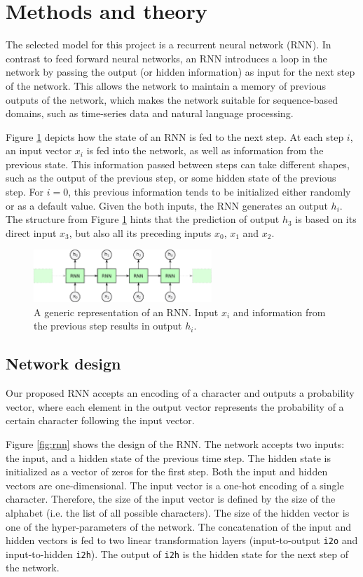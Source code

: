 \section{Methods and theory}
The selected model for this project is a recurrent neural network (RNN).
In contrast to feed forward neural networks, an RNN introduces a loop in the network by passing the output (or hidden information) as input for the next step of the network.
This allows the network to maintain a memory of previous outputs of the network, which makes the network suitable for sequence-based domains, such as time-series data and natural language processing.

Figure \ref{fig:unrolled} depicts how the state of an RNN is fed to the next step.
At each step $i$, an input vector $x_i$ is fed into the network, as well as information from the previous state.
This information passed between steps can take different shapes, such as the output of the previous step, or some hidden state of the previous step.
For $i=0$, this previous information tends to be initialized either randomly or as a default value.
Given the both inputs, the RNN generates an output $h_i$.
The structure from Figure \ref{fig:unrolled} hints that the prediction of output $h_3$ is based on its direct input $x_3$, but also all its preceding inputs $x_0$, $x_1$ and $x_2$.

\begin{figure}[t]
	\centering
	\includegraphics[width=0.6\textwidth]{figures/unrolled.eps} 
	\caption{A generic representation of an RNN. Input $x_i$ and information from the previous step results in output $h_i$.}
	\label{fig:unrolled}
\end{figure}

\subsection{Network design}
Our proposed RNN accepts an encoding of a character and outputs a probability vector, where each element in the output vector represents the probability of a certain character following the input vector.

Figure \ref{fig:rnn} shows the design of the RNN. The network accepts two inputs: the input, and a hidden state of the previous time step. 
The hidden state is initialized as a vector of zeros for the first step.
Both the input and hidden vectors are one-dimensional. 
The input vector is a one-hot encoding of a single character. 
Therefore, the size of the input vector is defined by the size of the alphabet (i.e. the list of all possible characters).
The size of the hidden vector is one of the hyper-parameters of the network.
The concatenation of the input and hidden vectors is fed to two linear transformation layers (input-to-output {\tt i2o} and input-to-hidden {\tt i2h}). 
The output of {\tt i2h} is the hidden state for the next step of the network.

